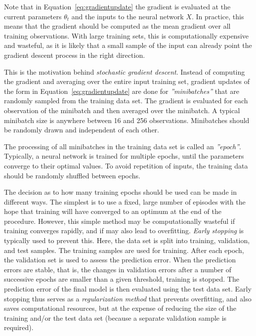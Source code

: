 Note that in Equation~\ref{eq:gradientupdate} the gradient is evaluated at the current parameters $\theta_t$ and the inputs to the neural network $X$. In practice, this means that the gradient should be computed as the mean gradient over all training observations. With large training sets, this is computationally expensive and wasteful, as it is likely that a small sample of the input can already point the gradient descent process in the right direction. 

This is the motivation behind \emph{stochastic gradient descent}. Instead of computing the gradient and averaging over the entire input training set, gradient updates of the form in Equation~\ref{eq:gradientupdate} are done for \emph{''minibatches''} that are randomly sampled from the training data set. The gradient is evaluated for each observation of the minibatch and then averaged over the minibatch. A typical minibatch size is anywhere between 16 and 256 observations. Minibatches should be randomly drawn and independent of each other. 

The processing of all minibatches in the training data set is called an \emph{''epoch''}. Typically, a neural network is trained for multiple epochs, until the parameters converge to their optimal values. To avoid repetition of inputs, the training data should be randomly shuffled between epochs.

The decision as to how many training epochs should be used can be made in different ways. The simplest is to use a fixed, large number of episodes with the hope that training will have converged to an optimum at the end of the procedure. However, this simple method may be computationally wasteful if training converges rapidly, and if may also lead to overfitting. \emph{Early stopping} is typically used to prevent this. Here, the data set is split into training, validation, and test samples. The training samples are used for training. After each epoch, the validation set is used to assess the prediction error. When the prediction errors are stable, that is, the changes in validation errors after a number of successive epochs are smaller than a given threshold, training is stopped. The prediction error of the final model is then evaluated using the test data set. Early stopping thus serves as a \emph{regularization method} that prevents overfitting, and also saves computational resources, but at the expense of reducing the size of the training and/or the test data set (because a separate validation sample is required).

